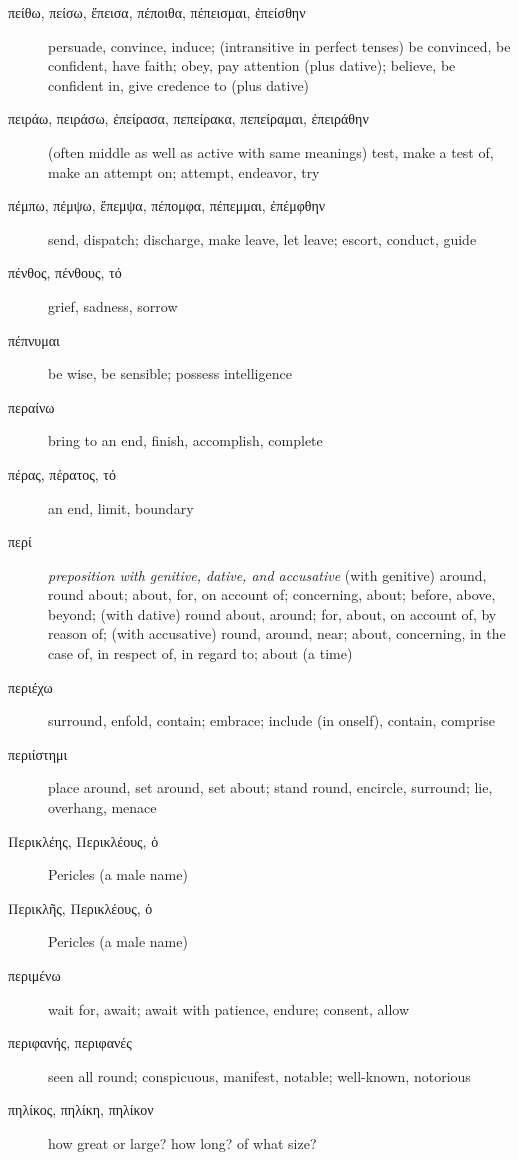 \documentclass[12pt,letterpaper]{article}
\begin{document}
\begin{description}
    \item[\textgreek{πείθω, πείσω, ἔπεισα, πέποιθα, πέπεισμαι, ἐπείσθην}] \marginnote{*}persuade, convince, induce; (intransitive in perfect tenses) be convinced, be confident, have faith; obey, pay attention (plus dative); believe, be confident in, give credence to (plus dative)
    \item[\textgreek{πειράω, πειράσω, ἐπείρασα, πεπείρακα, πεπείραμαι, ἐπειράθην}] \marginnote{*}(often middle as well as active with same meanings) test, make a test of, make an attempt on; attempt, endeavor, try
    \item[\textgreek{πέμπω, πέμψω, ἔπεμψα, πέπομφα, πέπεμμαι, ἐπέμφθην}] \marginnote{*}send, dispatch; discharge, make leave, let leave; escort, conduct, guide
    \item[\textgreek{πένθος, πένθους, τό}] grief, sadness, sorrow
    \item[\textgreek{πέπνυμαι}] be wise, be sensible; possess intelligence
    \item[\textgreek{περαίνω}] bring to an end, finish, accomplish, complete
    \item[\textgreek{πέρας, πέρατος, τό}] an end, limit, boundary
    \item[\textgreek{περί}] \marginnote{*}\textit{preposition with genitive, dative, and accusative} (with genitive) around, round about; about, for, on account of; concerning, about; before, above, beyond; (with dative) round about, around; for, about, on account of, by reason of; (with accusative) round, around, near; about, concerning, in the case of, in respect of, in regard to; about (a time)
    \item[\textgreek{περιέχω}] surround, enfold, contain; embrace; include (in onself), contain, comprise
    \item[\textgreek{περιίστημι}] place around, set around, set about; stand round, encircle, surround; lie, overhang, menace
    \item[\textgreek{Περικλέης, Περικλέους, ὁ}] Pericles (a male name)
    \item[\textgreek{Περικλῆς, Περικλέους, ὁ}] Pericles (a male name)
    \item[\textgreek{περιμένω}] wait for, await; await with patience, endure; consent, allow
    \item[\textgreek{περιφανής, περιφανές}] seen all round; conspicuous, manifest, notable; well-known, notorious
    \item[\textgreek{πηλίκος, πηλίκη, πηλίκον}] how great or large? how long? of what size?

\end{description}
\end{document}
